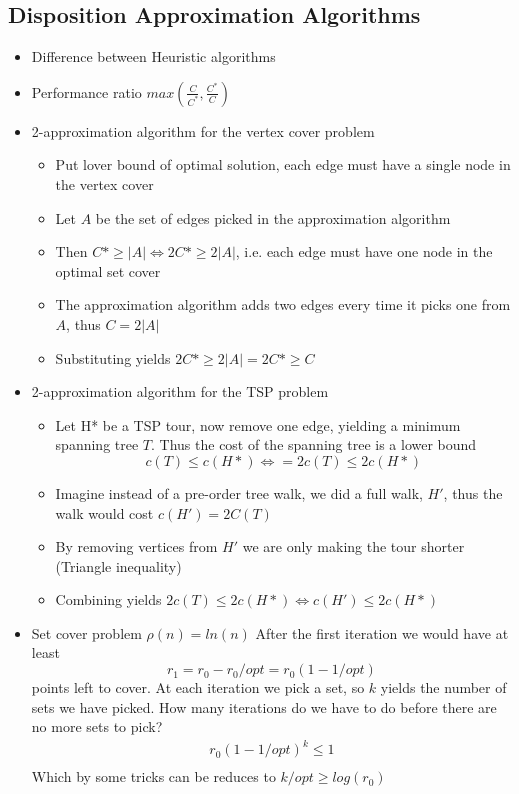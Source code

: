 \documentclass[10pt]{article}
\begin{document}
\subsection{Disposition Approximation Algorithms} %
\label{sub:disposition_approximation_algorithms}
\begin{itemize}
  \item Difference between Heuristic algorithms
  \item Performance ratio $max(\frac{C}{C^*}, \frac{C^*}{C})$
  \item 2-approximation algorithm for the vertex cover problem
  \begin{itemize}
    \item Put lover bound of optimal solution, each edge must have a single node in the vertex cover
    \item Let $A$ be the set of edges picked in the approximation algorithm
    \item Then $C* \geq |A| \Leftrightarrow 2C* \geq 2|A|$, i.e. each edge must have one node in the optimal set cover
    \item The approximation algorithm adds two edges every time it picks one from $A$, thus $C = 2|A|$
    \item Substituting yields $2C* \geq 2|A| = 2C* \geq C$
  \end{itemize}
  \item 2-approximation algorithm for the TSP problem
  \begin{itemize}
    \item Let H* be a TSP tour, now remove one edge, yielding a minimum spanning tree $T$. Thus the cost of the spanning tree is a lower bound 
    \begin{equation}
    c(T) \leq c(H*) \Leftrightarrow = 2c(T) \leq 2c(H*)
    \end{equation}
    \item Imagine instead of a pre-order tree walk, we did a full walk, $H'$, thus the walk would cost $c(H') = 2C(T)$
    \item By removing vertices from $H'$ we are only making the tour shorter (Triangle inequality)
    \item Combining yields $2c(T) \leq 2c(H*) \Leftrightarrow c(H') \leq 2c(H*) $
  \end{itemize}
  \item Set cover problem $\rho(n) = ln(n)$
  After the first iteration we would have at least 
  \begin{equation}
  r_1 = r_0-r_0/opt=r_0(1-1/opt)  
  \end{equation}
  points left to cover.  
  At each iteration we pick a set, so $k$ yields the number of sets we have picked. How many iterations do we have to do before there are no more sets to pick? 
  \begin{align}
  r_0(1-1/opt)^k \leq 1 \\
  \end{align}
  Which by some tricks can be reduces to $k/opt \geq log(r_0)$ 
\end{itemize}
\newpage
\end{document}
